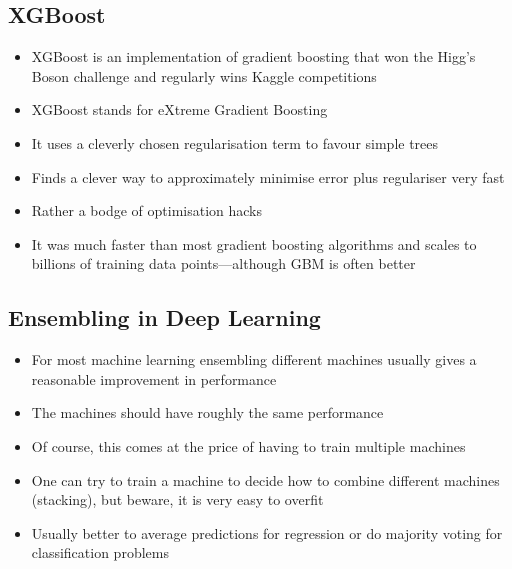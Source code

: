 \begin{slide}
\section[-2]{XGBoost}

\begin{PauseHighLight}
  \begin{itemize}
  \item XGBoost is an implementation of gradient boosting that won the
    Higg's Boson challenge and regularly wins Kaggle competitions\pause
  \item XGBoost stands for eXtreme Gradient Boosting\pause
  \item It uses a cleverly chosen regularisation term to favour simple
    trees\pause
  \item Finds a clever way to approximately minimise error plus
    regulariser very fast\pause
  \item Rather a bodge of optimisation hacks\pauseb
  \item It was much faster than most gradient boosting algorithms and
    scales to billions of training data points---although GBM is often
    better\pause
  \end{itemize}
\end{PauseHighLight}


\end{slide}



\Outline %

\begin{slide}
\section{Ensembling in Deep Learning}

\begin{PauseHighLight}
  \begin{itemize}
  \item For most machine learning ensembling different machines
    usually gives a reasonable improvement in performance\pause
  \item The machines should have roughly the same performance\pause
  \item Of course, this comes at the price of having to train multiple
    machines\pause
  \item One can try to train a machine to decide how to combine
    different machines (stacking)\pause, but beware, it is very easy
    to overfit\pauseb
  \item Usually better to average predictions for regression or do
    majority voting for classification problems\pause
  \end{itemize}
\end{PauseHighLight}

\end{slide}

